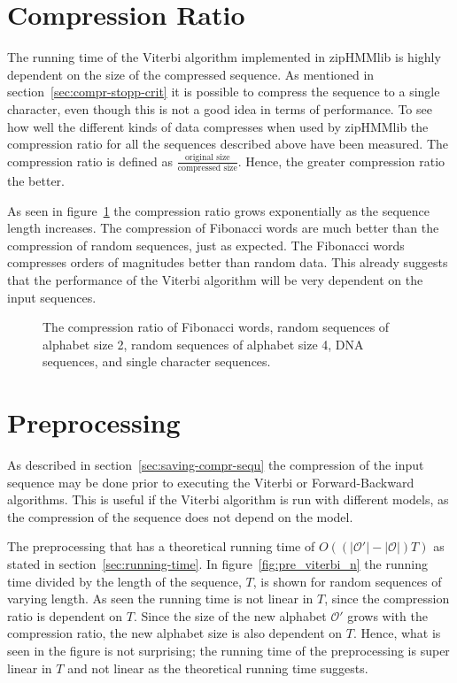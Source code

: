 \section{Compression Ratio}
\label{sec:compression-ratio}

The running time of the Viterbi algorithm implemented in zipHMMlib is highly
dependent on the size of the compressed sequence. As mentioned in
section~\ref{sec:compr-stopp-crit} it is possible to compress the sequence to a
single character, even though this is not a good idea in terms of
performance. To see how well the different kinds of data compresses when used
by zipHMMlib the compression ratio for all the sequences described above have
been measured. The compression ratio is defined as
$\frac{\text{original size}}{\text{compressed size}}$. Hence, the greater
compression ratio the better.

As seen in figure~\ref{fig:compression_ratio} the compression ratio grows
exponentially as the sequence length increases. The compression of Fibonacci
words are much better than the compression of random sequences, just as
expected. The Fibonacci words compresses orders of magnitudes better than
random data. This already suggests that the performance of the Viterbi
algorithm will be very dependent on the input sequences.  

\begin{figure}
  \centering
  
  \caption{The compression ratio of Fibonacci words, random sequences of
    alphabet size 2, random sequences of alphabet size 4, DNA
    sequences, and single character sequences.}
  \label{fig:compression_ratio}
\end{figure}

\section{Preprocessing}

As described in section~\ref{sec:saving-compr-sequ} the compression of the
input sequence may be done prior to executing the Viterbi or Forward-Backward
algorithms. This is useful if the Viterbi algorithm is run with different
models, as the compression of the sequence does not depend on the model.

The preprocessing that has a theoretical running time of
$O( \left( \lvert\mathcal{O'}\rvert - \lvert{\mathcal{O}}\rvert \right) T)$ as
stated in section~\ref{sec:running-time}. In figure~\ref{fig:pre_viterbi_n} the
running time divided by the length of the sequence, $T$, is shown for random
sequences of varying length. As seen the running time is not linear in $T$,
since the compression ratio is dependent on $T$. Since the size of the new
alphabet $\mathcal{O'}$ grows with the compression ratio, the new alphabet size
is also dependent on $T$. Hence, what is seen in the figure is not surprising;
the running time of the preprocessing is super linear in $T$ and not linear as
the theoretical running time suggests.

